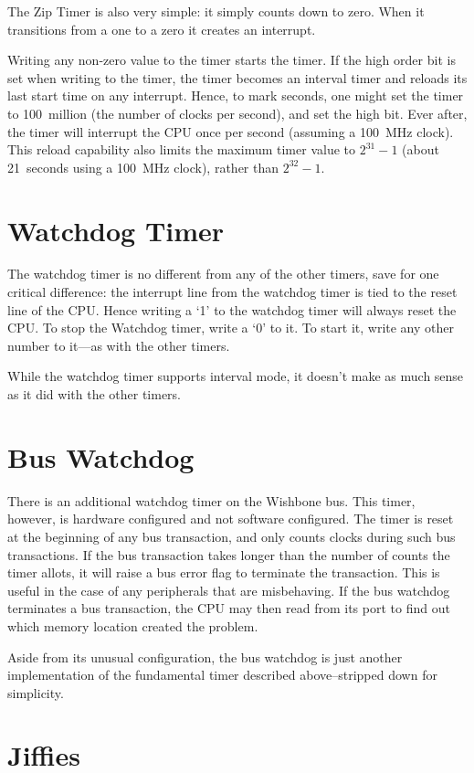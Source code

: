 \documentclass{gqtekspec}
\begin{document}
The Zip Timer is also very simple: it simply counts down to zero.  When it
transitions from a one to a zero it creates an interrupt.

Writing any non-zero value to the timer starts the timer.  If the high order
bit is set when writing to the timer, the timer becomes an interval timer and
reloads its last start time on any interrupt.  Hence, to mark seconds, one
might set the timer to 100~million (the number of clocks per second), and
set the high bit.  Ever after, the timer will interrupt the CPU once per
second (assuming a 100~MHz clock).  This reload capability also limits the
maximum timer value to $2^{31}-1$ (about 21~seconds using a 100~MHz clock),
rather than $2^{32}-1$.

\section{Watchdog Timer}

The watchdog timer is no different from any of the other timers, save for one
critical difference: the interrupt line from the watchdog
timer is tied to the reset line of the CPU.  Hence writing a `1' to the 
watchdog timer will always reset the CPU.  
To stop the Watchdog timer, write a `0' to it.  To start it,
write any other number to it---as with the other timers.

While the watchdog timer supports interval mode, it doesn't make as much sense
as it did with the other timers.

\section{Bus Watchdog}
There is an additional watchdog timer on the Wishbone bus.  This timer,
however, is hardware configured and not software configured.  The timer is
reset at the beginning of any bus transaction, and only counts clocks during
such bus transactions.  If the bus transaction takes longer than the number
of counts the timer allots, it will raise a bus error flag to terminate the
transaction.  This is useful in the case of any peripherals that are
misbehaving.  If the bus watchdog terminates a bus transaction, the CPU may
then read from its port to find out which memory location created the problem.

Aside from its unusual configuration, the bus watchdog is just another
implementation of the fundamental timer described above--stripped down
for simplicity.

\section{Jiffies}
\end{document}
